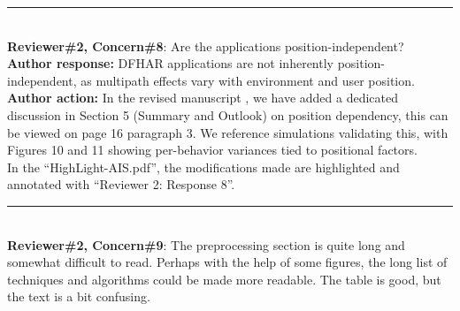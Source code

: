 \documentclass[Afour,sageh,times]{sagej}
\begin{document}
\color{gray}\rule{\linewidth}{1pt}\normalcolor\\

\textcolor{myGreen}{ \textbf{Reviewer\#2, Concern\#8}: Are the applications position-independent?}  \\

\textbf{Author response:} DFHAR applications are not inherently position-independent, as multipath effects vary with environment and user position.\\
\textbf{Author action:} In the revised manuscript , we have added a dedicated discussion in Section 5 (Summary and Outlook) on position dependency, this can be viewed on page 16 paragraph 3. We reference simulations validating this, with Figures 10 and 11 showing per-behavior variances tied to positional factors.\\

\textcolor{myOrange}{
In the “HighLight-AIS.pdf”, the modifications made are highlighted and annotated with “Reviewer 2: Response 8”. }\\ 

\color{gray}\rule{\linewidth}{1pt}\normalcolor\\

\textcolor{myGreen}{ \textbf{Reviewer\#2, Concern\#9}: The preprocessing section is quite long and somewhat difficult to read. Perhaps with the help of some figures, the long list of techniques and algorithms could be made more readable. The table is good, but the text is a bit confusing.}  \\
\end{document}

